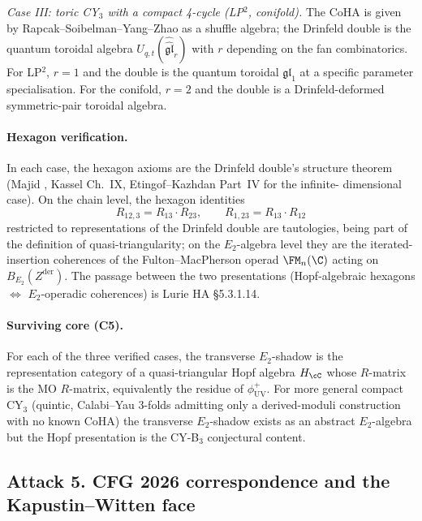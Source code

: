 \emph{Case III: toric CY$_3$ with a compact 4-cycle (LP$^2$,
conifold).}  The CoHA is given by Rapcak--Soibelman--Yang--Zhao
\cite{RSYZ} as a shuffle algebra; the Drinfeld double is the
quantum toroidal algebra $U_{q, t}(\widehat{\widehat{\mathfrak{gl}}}_r)$
with $r$ depending on the fan combinatorics.  For LP$^2$, $r = 1$ and
the double is the quantum toroidal $\mathfrak{gl}_1$ at a specific
parameter specialisation.  For the conifold, $r = 2$ and the double
is a Drinfeld-deformed symmetric-pair toroidal algebra.

\paragraph{Hexagon verification.}  In each case, the hexagon axioms
are the Drinfeld double's structure theorem
(Majid \cite{Majid1990}, Kassel \cite{KasselQuantumGroups} Ch.~IX,
Etingof--Kazhdan \cite{EtingofKazhdan2008} Part~IV for the infinite-
dimensional case).  On the chain level, the hexagon identities
\[
 R_{12, 3} = R_{13} \cdot R_{23}, \qquad R_{1, 23} = R_{13} \cdot
 R_{12}
\]
restricted to representations of the Drinfeld double are tautologies,
being part of the definition of quasi-triangularity; on the
$E_2$-algebra level they are the iterated-insertion coherences of the
Fulton--MacPherson operad $\FM_n(\C)$ acting on
$B_{E_2}(Z^{\mathrm{der}})$.  The passage between the two
presentations (Hopf-algebraic hexagons $\Leftrightarrow$
$E_2$-operadic coherences) is Lurie HA \S5.3.1.14.

\paragraph{Surviving core (C5).}  For each of the three verified
cases, the transverse $E_2$-shadow is the representation category of a
quasi-triangular Hopf algebra $H_\cC$ whose $R$-matrix is the MO
$R$-matrix, equivalently the residue of $\phi^+_{\mathrm{UV}}$.  For
more general compact CY$_3$ (quintic, Calabi--Yau 3-folds admitting
only a derived-moduli construction with no known CoHA) the transverse
$E_2$-shadow exists as an abstract $E_2$-algebra but the Hopf
presentation is the CY-B$_3$ conjectural content.


\subsection*{Attack 5.  CFG 2026 correspondence and the Kapustin--Witten face}

